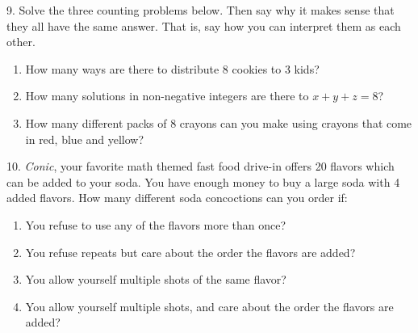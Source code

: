 \documentclass[10pt,]{book}
\theoremstyle{plain}
\theoremstyle{definition}
\theoremstyle{definition}
\theoremstyle{definition}
\numberwithin{equation}{chapter}
\begin{document}
\begin{exerciselist}
%
\par\smallskip
\item[9.]\hypertarget{exercise-90}{}
Solve the three counting problems below. Then say why it makes sense that they all have the same answer. That is, say how you can interpret them as each other.
%
\leavevmode%
\begin{enumerate}[label=(\alph*)]
\item\hypertarget{li-598}{}
How many ways are there to distribute 8 cookies to 3 kids?
%
\item\hypertarget{li-599}{}
How many solutions in non-negative integers are there to \(x+y+z = 8\)?
%
\item\hypertarget{li-600}{}
How many different packs of 8 crayons can you make using crayons that come in red, blue and yellow?
%
\end{enumerate}
\par\smallskip
\item[10.]\hypertarget{exercise-91}{}
\emph{Conic}, your favorite math themed fast food drive-in offers 20 flavors which can be added to your soda. You have enough money to buy a large soda with 4 added flavors. How many different soda concoctions can you order if:
%
\leavevmode%
\begin{enumerate}[label=(\alph*)]
\item\hypertarget{li-601}{}
You refuse to use any of the flavors more than once?
%
\item\hypertarget{li-602}{}
You refuse repeats but care about the order the flavors are added?
%
\item\hypertarget{li-603}{}
You allow yourself multiple shots of the same flavor?
%
\item\hypertarget{li-604}{}
You allow yourself multiple shots, and care about the order the flavors are added?
%
\end{enumerate}
\par\smallskip
\end{exerciselist}
\typeout{************************************************}
\typeout{************************************************}
\end{document}
